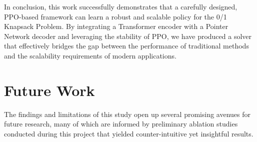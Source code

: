 In conclusion, this work successfully demonstrates that a carefully designed, PPO-based framework can learn a robust and scalable policy for the 0/1 Knapsack Problem.
By integrating a Transformer encoder with a Pointer Network decoder and leveraging the stability of PPO, we have produced a solver that effectively bridges the gap between the performance of traditional methods and the scalability requirements of modern applications.

\section{Future Work}
\label{sec:future_work}

The findings and limitations of this study open up several promising avenues for future research, many of which are informed by preliminary ablation studies conducted during this project that yielded counter-intuitive yet insightful results.

